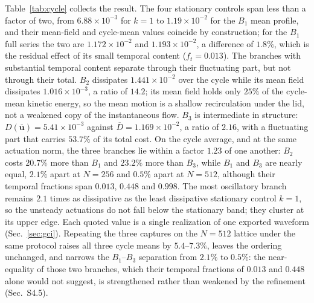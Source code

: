 \documentclass[11pt,a4paper]{article}
\newcommand{\Dbar}{\overline{D}}
\begin{document}
Table~\ref{tab:cycle} collects the result. The four stationary controls span
less than a factor of two, from $6.88\times10^{-3}$ for $k=1$ to
$1.19\times10^{-2}$ for the $B_1$ mean profile, and their mean-field and cycle-mean
values coincide by construction; for the $B_1$ full series the two are
$1.172\times10^{-2}$ and $1.193\times10^{-2}$, a difference of $1.8\%$, which is
the residual effect of its small temporal content ($f_t=0.013$). The branches with
substantial temporal content separate through their fluctuating part, but not
through their total. $B_2$ dissipates $1.441\times10^{-2}$ over the cycle while its
mean field dissipates $1.016\times10^{-3}$, a ratio of $14.2$; its mean field holds
only $25\%$ of the cycle-mean kinetic energy, so the mean motion is a shallow
recirculation under the lid, not a weakened copy of the instantaneous flow. $B_3$
is intermediate in structure: $D(\overline{\mathbf{u}})=5.41\times10^{-3}$ against
$\Dbar=1.169\times10^{-2}$, a ratio of $2.16$, with a fluctuating part that carries
$53.7\%$ of its total cost. On the cycle average, and at the same actuation norm,
the three branches lie within a factor $1.23$ of one another: $B_2$ costs
$20.7\%$ more than $B_1$ and $23.2\%$ more than $B_3$, while $B_1$ and $B_3$ are
nearly equal, $2.1\%$ apart at $N=256$ and $0.5\%$ apart at $N=512$, although their
temporal fractions span $0.013$, $0.448$ and $0.998$.
The most oscillatory branch remains $2.1$ times as dissipative as the least
dissipative stationary control $k=1$, so the unsteady actuations do not fall below
the stationary band; they cluster at its upper edge. Each quoted value is a single
realization of one exported waveform (Sec.~\ref{sec:gci}). Repeating the three
captures on the $N=512$ lattice under the same protocol raises all three cycle
means by $5.4$--$7.3\%$, leaves the ordering unchanged, and narrows the $B_1$--$B_3$
separation from $2.1\%$ to $0.5\%$: the near-equality of those two branches, which
their temporal fractions of $0.013$ and $0.448$ alone would not suggest, is
strengthened rather than weakened by the refinement (Sec.~S4.5).
\end{document}

